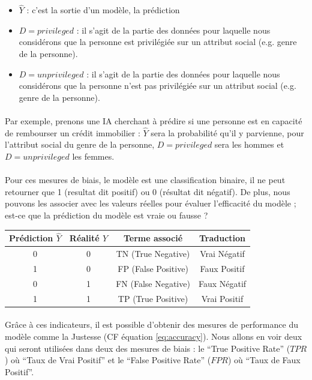 \documentclass[10pt, french, a4paper]{report}
\begin{document}
\begin{itemize}
  \item $\hat{Y}$ : c'est la sortie d'un modèle, la prédiction
  \item $D = privileged$ : il s'agit de la partie des données pour laquelle nous considérons que la personne est privilégiée sur un attribut social (e.g. genre de la personne).
  \item $D = unprivileged$ : il s'agit de la partie des données pour laquelle nous considérons que la personne n'est pas privilégiée sur un attribut social (e.g. genre de la personne).
\end{itemize}

\paragraph{}
Par exemple, prenons une IA cherchant à prédire si une personne est en capacité de rembourser un crédit immobilier : $\hat{Y}$ sera la probabilité qu'il y parvienne, pour l'attribut social du genre de la personne, $D = privileged$ sera les hommes et $D = unprivileged$ les femmes.

\paragraph{}
Pour ces mesures de biais, le modèle est une classification binaire, il ne peut retourner que 1 (resultat dit positif) ou 0 (résultat dit négatif). De plus, nous pouvons les associer avec les valeurs réelles pour évaluer l'efficacité du modèle ; est-ce que la prédiction du modèle est vraie ou fausse ?

\begin{center}
  \begin{tabular}{ |c|c|c|c| } 
   \hline
   Prédiction $\hat{Y}$ & Réalité $Y$ & Terme associé & Traduction \\ 
   \hline
   0 & 0 & TN (True Negative) & Vrai Négatif \\ 
   1 & 0 & FP (False Positive) & Faux Positif \\ 
   0 & 1 & FN (False Negative) & Faux Négatif \\ 
   1 & 1 & TP (True Positive) & Vrai Positif \\ 
   \hline
  \end{tabular}
\end{center}

\paragraph{}
Grâce à ces indicateurs, il est possible d'obtenir des mesures de performance du modèle comme la Justesse (CF équation \ref{eq:accuracy}). Nous allons en voir deux qui seront utilisées dans deux des mesures de biais : le ``True Positive Rate'' ($TPR$) où ``Taux de Vrai Positif'' et le ``False Positive Rate'' ($FPR$) où ``Taux de Faux Positif''.
\end{document}

